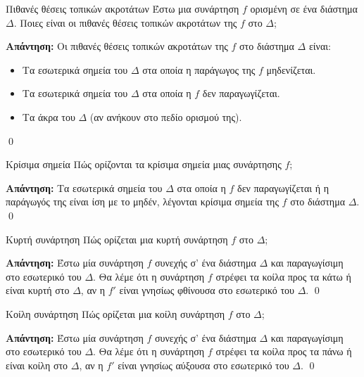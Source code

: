 \documentclass[a4paper, 12pt]{article}
\renewenvironment{proof}[1][\textbf{Απάντηση}]{%
  \par\noindent\textbf{#1:} \rmfamily}{\qed\par}
\begin{document}
\begin{theorem}{Πιθανές θέσεις τοπικών ακροτάτων}
  Έστω μια συνάρτηση $f$ ορισμένη σε ένα διάστημα $Δ$. Ποιες είναι οι πιθανές θέσεις τοπικών ακροτάτων της $f$ στο $Δ$;
\end{theorem}
\begin{proof}
  Οι πιθανές θέσεις τοπικών ακροτάτων της $f$ στο διάστημα $Δ$ είναι:
  \begin{itemize}
    \item Τα εσωτερικά σημεία του $Δ$ στα οποία η παράγωγος της $f$ μηδενίζεται.
    \item Τα εσωτερικά σημεία του $Δ$ στα οποία η $f$ δεν παραγωγίζεται.
    \item Τα άκρα του $Δ$ (αν ανήκουν στο πεδίο ορισμού της).
  \end{itemize}
\end{proof}

\begin{theorem}{Κρίσιμα σημεία}
  Πώς ορίζονται τα κρίσιμα σημεία μιας συνάρτησης $f$;
\end{theorem}
\begin{proof}
  Τα εσωτερικά σημεία του $Δ$ στα οποία η $f$ δεν παραγωγίζεται ή η παράγωγός της είναι ίση με το μηδέν, λέγονται κρίσιμα σημεία της $f$ στο διάστημα $Δ$.
\end{proof}

\begin{theorem}{Κυρτή συνάρτηση}
  Πώς ορίζεται μια κυρτή συνάρτηση $f$ στο $Δ$;
\end{theorem}
\begin{proof}
  Έστω μία συνάρτηση $f$ συνεχής σ' ένα διάστημα $Δ$ και παραγωγίσιμη στο εσωτερικό του $Δ$. Θα λέμε ότι η συνάρτηση $f$ στρέφει τα κοίλα προς τα κάτω ή είναι κυρτή στο $Δ$, αν η $f '$ είναι γνησίως φθίνουσα στο εσωτερικό του $Δ$.
\end{proof}

\begin{theorem}{Κοίλη συνάρτηση}
  Πώς ορίζεται μια κοίλη συνάρτηση $f$ στο $Δ$;
\end{theorem}
\begin{proof}
  Έστω μία συνάρτηση $f$ συνεχής σ' ένα διάστημα $Δ$ και παραγωγίσιμη στο εσωτερικό του $Δ$. Θα λέμε ότι η συνάρτηση $f$ στρέφει τα κοίλα προς τα πάνω ή είναι κοίλη στο $Δ$, αν η $f '$ είναι γνησίως αύξουσα στο εσωτερικό του $Δ$.
\end{proof}
\end{document}
